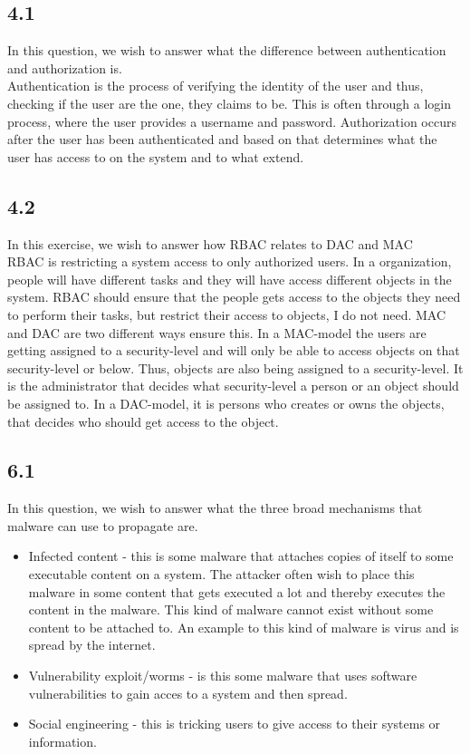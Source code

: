 \documentclass{article}
\begin{document}
\subsection{4.1}
In this question, we wish to answer what the difference between authentication and authorization is. \\ 

Authentication is the process of verifying the identity of the user and thus, checking if the user are the one, they claims to be. This is often through a login process, where the user provides a username and password. Authorization occurs after the user has been authenticated and based on that determines what the user has access to on the system and to what extend. 

\subsection{4.2}
In this exercise, we wish to answer how RBAC relates to DAC and MAC\\

RBAC is restricting a system access to only authorized users. In a organization, people will have different tasks and they will have access different objects in the system. RBAC should ensure that the people gets access to the objects they need to perform their tasks, but restrict their access to objects, I do not need. MAC and DAC are two different ways ensure this. In a MAC-model the users are getting assigned to a security-level and will only be able to access objects on that security-level or below. Thus, objects are also being assigned to a security-level. It is the administrator that decides what security-level a person or an object should be assigned to. In a DAC-model, it is persons who creates or owns the objects, that decides who should get access to the object. 

\subsection{6.1}
In this question, we wish to answer what the three broad mechanisms that malware can use to propagate are.\\ 

\begin{itemize}
    \item Infected content - this is some malware that attaches copies of itself to some executable content on a system. The attacker often wish to place this malware in some content that gets executed a lot and thereby executes the content in the malware. This kind of malware cannot exist without some content to be attached to.  An example to this kind of malware is virus and is spread by the internet. 

    \item Vulnerability exploit/worms - is this some malware that uses software vulnerabilities to gain acces to a system and then spread. 
    
    \item Social engineering - this is tricking users to give access to their systems or information.  
\end{itemize}
\end{document}
